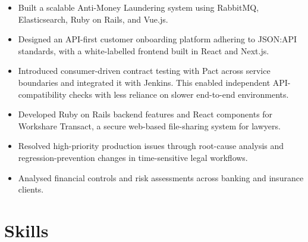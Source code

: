 \documentclass[11pt,letterpaper]{article}
\begin{document}
\begin{itemize}
  \item Built a scalable Anti-Money Laundering system using RabbitMQ, Elasticsearch, Ruby on Rails, and Vue.js.
  \item Designed an API-first customer onboarding platform adhering to JSON:API standards, with a white-labelled frontend built in React and Next.js.
  \item Introduced consumer-driven contract testing with Pact across service boundaries and integrated it with Jenkins. This enabled independent API-compatibility checks with less reliance on slower end-to-end environments.
\end{itemize}

\begin{itemize}
  \item Developed Ruby on Rails backend features and React components for Workshare Transact, a secure web-based file-sharing system for lawyers.
  \item Resolved high-priority production issues through root-cause analysis and regression-prevention changes in time-sensitive legal workflows.
\end{itemize}

\begin{itemize}
  \item Analysed financial controls and risk assessments across banking and insurance clients.
\end{itemize}

\newpage
\section*{Skills}
\end{document}
